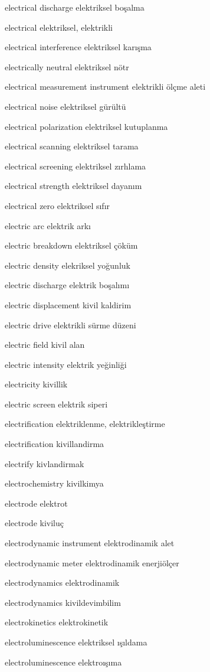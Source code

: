 \documentclass[12pt,fleqn]{article}\usepackage{../../common}
\begin{document}
electrical discharge elektriksel boşalma

electrical elektriksel, elektrikli

electrical interference elektriksel karışma

electrically neutral elektriksel nötr

electrical measurement instrument elektrikli ölçme aleti

electrical noise elektriksel gürültü

electrical polarization elektriksel kutuplanma

electrical scanning elektriksel tarama

electrical screening elektriksel zırhlama

electrical strength elektriksel dayanım

electrical zero elektriksel sıfır

electric arc elektrik arkı

electric breakdown elektriksel çöküm

electric density elekriksel yoğunluk

electric discharge elektrik boşalımı

electric displacement kivil kaldirim

electric drive elektrikli sürme düzeni

electric field kivil alan

electric intensity elektrik yeğinliği

electricity kivillik

electric screen elektrik siperi

electrification elektriklenme, elektrikleştirme

electrification kivillandirma

electrify kivlandirmak

electrochemistry kivilkimya

electrode elektrot

electrode kiviluç

electrodynamic instrument elektrodinamik alet

electrodynamic meter elektrodinamik enerjiölçer

electrodynamics elektrodinamik

electrodynamics kivildevimbilim

electrokinetics elektrokinetik

electroluminescence elektriksel ışıldama

electroluminescence elektroışıma
\end{document}
